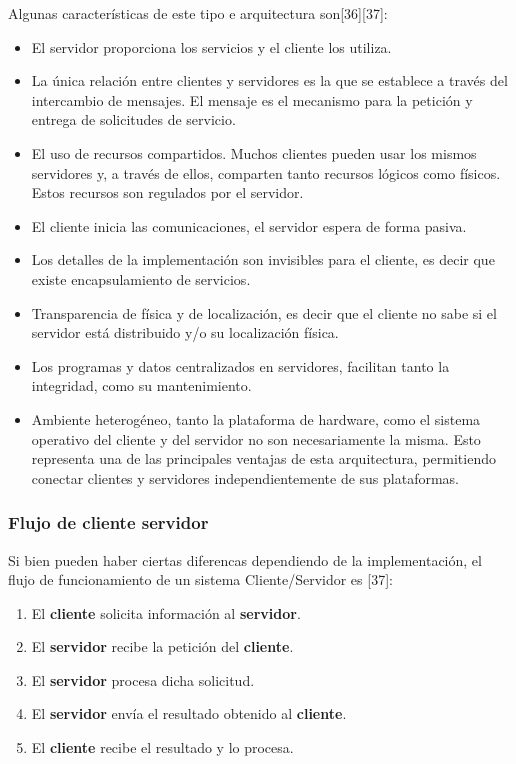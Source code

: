 Algunas características de este tipo e arquitectura son[36][37]:
\begin{itemize}
 \item El servidor proporciona los servicios y el cliente los utiliza.
 \item La única relación entre clientes y servidores es la que se establece a través del intercambio de mensajes. El mensaje es el 
       mecanismo para la petición y entrega de solicitudes de servicio. 
 \item El uso de recursos compartidos. Muchos clientes pueden usar los mismos servidores y, a través de ellos, comparten tanto recursos 
       lógicos como físicos. Estos recursos son regulados por el servidor.
 \item El cliente inicia las comunicaciones, el servidor espera de forma pasiva.
 \item Los detalles de la implementación son invisibles para el cliente, es decir que existe encapsulamiento de servicios.
 \item Transparencia de física y de localización, es decir que el cliente no sabe si el servidor está distribuido y/o su localización 
       física.
 \item Los programas y datos centralizados en servidores, facilitan tanto la integridad, como su mantenimiento.
 \item Ambiente heterogéneo, tanto la plataforma de hardware, como el sistema operativo del cliente y del servidor no son necesariamente 
       la misma. Esto representa una de las principales ventajas de esta arquitectura, permitiendo conectar clientes y servidores 
       independientemente de sus plataformas. 
\end{itemize}

\subsubsection{Flujo de cliente servidor}

Si bien pueden haber ciertas diferencas dependiendo de la implementación, el flujo  de funcionamiento de un sistema 
Cliente/Servidor es [37]:

\begin{enumerate}
 \item El \textbf{cliente} solicita  información al \textbf{servidor}.
 \item El \textbf{servidor} recibe la petición del \textbf{cliente}.
 \item El \textbf{servidor} procesa dicha solicitud.
 \item El \textbf{servidor} envía el resultado obtenido al \textbf{cliente}.
 \item El \textbf{cliente} recibe el resultado y lo procesa.
\end{enumerate}

